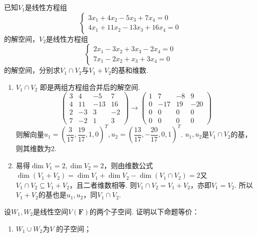 \begin{exercise}
    \begin{exgroup}
        \item 已知$V_1$是线性方程组\[\begin{cases}
                3x_1+4x_2-5x_3+7x_4=0 \\
                4x_1+11x_2-13x_3+16x_4=0
            \end{cases}\]
        的解空间，$V_2$是线性方程组\[\begin{cases}
                2x_1-3x_2+3x_3-2x_4=0 \\
                7x_1-2x_2+x_3+3x_4=0
            \end{cases}\]
        的解空间，分别求$V_1 \cap V_2$与$V_1+V_2$的基和维数.
        \begin{answer}
            \begin{enumerate}
                \item $V_1\cap V_2$ 即是两组方程组合并后的解空间.
                      \[\begin{pmatrix}
                              3 & 4  & -5  & 7  \\
                              4 & 11 & -13 & 16 \\
                              2 & -3 & 3   & -2 \\
                              7 & -2 & 1   & 3
                          \end{pmatrix}\rightarrow
                          \begin{pmatrix}1 & 7   & -8 & 9   \\
                 0 & -17 & 19 & -20 \\
                 0 & 0   & 0  & 0   \\
                 0 & 0   & 0  & 0
                          \end{pmatrix}\]
                      则解向量$u_1=\left(\dfrac {3}{17},\dfrac{19}{17},1,0\right)^T,u_2=\left(\dfrac{13}{17},-\dfrac{20}{17},0,1\right)^T$. $u_1,u_2$是$V_1\cap V_2$的基，则其维数为2.

                \item 易得$\dim V_1=2,\dim V_2=2$，则由维数公式$\dim (V_1+V_2)=\dim V_1+\dim V_2-\dim (V_1\cap V_2)= 2$又$V_1\cap V_2\subseteq V_1+V_2$，且二者维数相等. 则$V_1\cap V_2=V_1+V_2$，亦即$V_1=V_2$. 所以$V_1+V_2$的基也是$u_1,u_2$，同$V_1\cap V_2$.
            \end{enumerate}
        \end{answer}
        \item 设$W_1,W_2$是线性空间$V(\mathbf{F})$的两个子空间. 证明以下命题等价：
        \begin{enumerate}
            \item $W_1 \cup W_2$为$V$ 的子空间；


\end{enumerate}
\end{exgroup}
\end{exercise}
